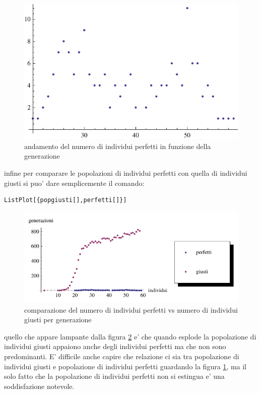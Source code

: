 \documentclass[12pt, a4paper]{article}
\begin{document}
\begin{figure}[!h]
\begin{center}
\includegraphics[width=12.0cm]{perfpop.pdf}
\caption{andamento del numero di individui perfetti in funzione della generazione} 
\label{figure:perfdist}
\end{center}
\end{figure}


infine per comparare le popolazioni di individui perfetti con quella di individui giusti si puo' dare semplicemente il comando:
\begin{lstlisting}
ListPlot[{popgiusti[],perfetti[]}]
\end{lstlisting}

\begin{figure}[!h]
\begin{center}
\includegraphics[width=12.0cm]{perfcomp.pdf}
\caption{comparazione del numero di individui perfetti vs numero di individui giusti per generazione} 
\label{figure:perfcomp}
\end{center}
\end{figure}



quello che appare lampante dalla figura \ref{figure:perfcomp} e' che quando esplode la popolazione di individui giusti appaiono anche degli individui perfetti ma che non sono predominanti.
E' difficile anche capire che relazione ci sia tra popolazione di individui giusti e popolazione di individui perfetti guardando la figura \ref{figure:perfdist}, ma il solo fatto che la popolazione di individui perfetti non si estingua e' una soddisfazione notevole.
\end{document}
